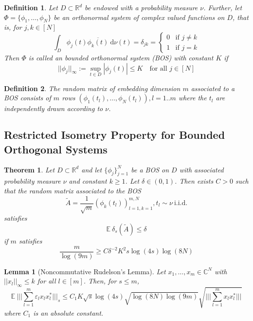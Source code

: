 \documentclass[10pt,a4paper]{article}
\theoremstyle{thmstyle}
\newtheorem{definition}{Definition}
\newtheorem{lemma}{Lemma}
\newtheorem{theorem}{Theorem}
\newcommand{\diff}{~\mathrm{d}}
\newcommand{\E}{\mathbb{E}~}
\begin{document}
\begin{definition}
  Let $D \subset \mathbb{R}^{d}$ be endowed with a probability measure $\nu$.
  Further, let $\Phi = \{ \phi_{1}, \dots, \phi_{N} \}$ be an orthonormal system of complex valued functions on $D$, that is, for $j, k \in [N]$
  \begin{equation*}
    \int_{D} \phi_{j}(t) \overline{\phi_{k}(t)} \diff \nu(t) = \delta_{jk} = \begin{cases}
      0 & \text{if $j \ne k$}\\
      1 & \text{if $j = k$}
    \end{cases}
  \end{equation*}
  Then $\Phi$ is called an \emph{bounded orthonormal system} (BOS) with constant $K$ if
  \begin{equation*}
    ||\phi_{j}||_{\infty} := \sup_{t \in D} |\phi_{j}(t)| \le K \quad \text{for all $j \in [N]$}
  \end{equation*}
\end{definition}

\begin{definition}
  The \emph{random matrix} of embedding dimension $m$ associated to a BOS consists of $m$ rows $(\phi_{1}(t_{l}), \dots, \phi_{N}(t_{l})), l = 1..m$ where the $t_{l}$ are independently drawn according to $\nu$.
\end{definition}

\subsection{Restricted Isometry Property for Bounded Orthogonal Systems}

\begin{theorem}
  Let $D \subset \mathbb{R}^{d}$ and let $\{ \phi_{j} \}_{j = 1}^{N}$ be a BOS on $D$ with associated probability measure $\nu$ and constant $k \ge 1$.
  Let $\delta \in (0, 1)$.
  Then exists $C > 0$ such that the random matrix associated to the BOS
  \begin{equation*}
    \tilde{A} = \frac{1}{\sqrt{m}} \left( \phi_{k}(t_{l}) \right)_{l = 1, k = 1}^{m, N}, t_{l} \sim \nu~\text{i.i.d.}
  \end{equation*}
  satisfies
  \begin{equation*}
    \E \delta_{s}(\tilde{A}) \le \delta
  \end{equation*}
  if $m$ satisfies
  \begin{equation*}
    \frac{m}{\log(9m)} \ge C \delta^{-2} K^{2} s \log(4s)\log(8N)
  \end{equation*}
\end{theorem}

\begin{lemma}[Noncommutative Rudelson's Lemma]
  Let $x_{1}, \dots, x_{m} \in \mathbb{C}^{N}$ with $||x_{l}||_{\infty} \le k$ for all $l \in [m]$.
  Then, for $s \le m$,
  \begin{equation*}
    \E \Big|\Big|\Big| \sum_{l = 1}^{m} \varepsilon_{l} x_{l}x_{l}^{*} \Big|\Big|\Big|_{s} \le C_{1} K \sqrt{s} \log(4s) \sqrt{\log(8N) \log(9m)} \sqrt{\Big|\Big|\Big| \sum_{l = 1}^{m} x_{l}x_{l}^{*} \Big|\Big|\Big|}
  \end{equation*}
  where $C_{1}$ is an absolute constant.
\end{lemma}
\end{document}
